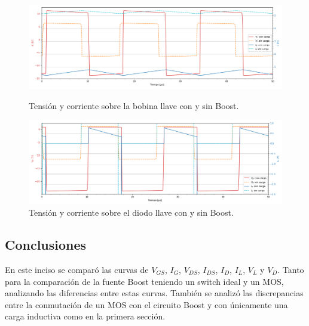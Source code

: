 \begin{figure}[H]
	\centering
	\begin{minipage}{0.495\textwidth}
		\centering
		\includegraphics[width=\linewidth]{ImagenesEjercicio-3/il-vl-1v3}
		\caption{Tensión y corriente sobre la bobina llave con y sin Boost.}
		\label{fig:ej3:Il_Vl_SWITCH_BOOST}
	\end{minipage}\hfill
	\begin{minipage}{0.495\textwidth}
		\centering
		\includegraphics[width=\linewidth]{ImagenesEjercicio-3/id-vd-1v3}
		\caption{Tensión y corriente sobre el diodo llave con y sin Boost.}
		\label{fig:ej3:Id_Vd_SWITCH_BOOST}
	\end{minipage}\hfill
\end{figure}

\subsection{Conclusiones}
En este inciso se comparó las curvas de $V_{GS}$, $I_{G}$, $V_{DS}$, $I_{DS}$, $I_{D}$, $I_{L}$, $V_{L}$ y $V_{D}$.
Tanto para la comparación de la fuente Boost teniendo un switch ideal y un MOS, analizando las diferencias entre estas curvas. También se analizó las discrepancias entre la conmutación de un MOS con el circuito Boost y con únicamente una carga inductiva como en la primera sección. 


%
